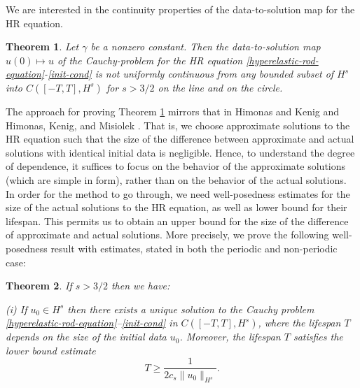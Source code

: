 \documentclass[a0,portrait]{a0poster}
\newtheorem{theorem}{Theorem}
\begin{document}
\begin{multicols}{3}
We are interested in the continuity properties of the data-to-solution map for the HR 
equation. 
%
%
%
%
%
%
\begin{theorem}
\label{hr-non-unif-dependence}
Let $\gamma$ be a nonzero constant. Then 
the data-to-solution map $u(0) \mapsto u$ of the Cauchy-problem
for the HR equation
\eqref{hyperelastic-rod-equation}-\eqref{init-cond}
is not uniformly continuous
from any bounded subset of  $H^s$ into $C([-T, T], H^s)$
for $s>3/2$ on the line and on the circle.
%
\end{theorem}
%
%
%
%
The approach for proving Theorem \ref{hr-non-unif-dependence}  
mirrors  that in Himonas and Kenig \cite{Himonas:2009fk} and 
Himonas, Kenig, and Misiolek \cite{Himonas_2009_Non-uniform-dep-per}.
That is, we choose 
approximate solutions to the HR equation such that the size of the difference between approximate and actual solutions with 
identical initial data is negligible. Hence, to understand the degree of 
dependence, it suffices to focus on the behavior of the approximate 
solutions (which are simple in form), rather than on the behavior of the 
actual solutions. In order for the method to go through, we 
need well-posedness estimates for  the size of the 
actual solutions to the HR equation, as well as
lower bound for their lifespan. This permits us to obtain an upper 
bound for the size of the difference of approximate and actual solutions. 
More precisely, we prove the following well-posedness result with estimates,  
stated in both the periodic and non-periodic case:


%
%
%
%
%
%
\begin{theorem}
\label{thm:HR_existence_continuous_dependence}
If   $s>3/2$  then we have:

(i) If $u_0\in H^s$  then  there exists a unique solution to
the Cauchy problem  \eqref{hyperelastic-rod-equation}--\eqref{init-cond} in $C([-T, T], H^s)$, where 
the lifespan  $T$ depends on the size
of the initial data $u_0$. Moreover, 
the  lifespan $T$ satisfies the lower bound estimate 
%
%
%
\begin{equation*}
T
\ge
\frac{1}{2c_s \|u_0\|_{H^s}}.
\end{equation*}
%


\end{theorem}
\end{multicols}
\end{document}
